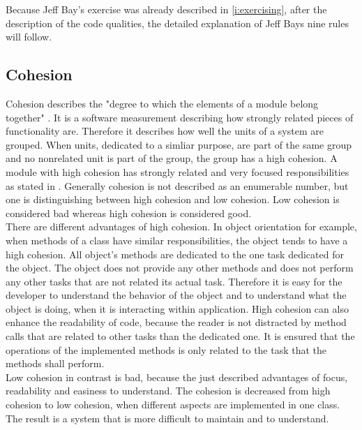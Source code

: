 Because Jeff Bay's exercise was already described in \ref{i:exercising}, after the description of the code qualities, the detailed explanation of Jeff Bays nine rules will follow. 

\subsection*{Cohesion}
\label{cohesion}
Cohesion describes the "degree to which the elements of a module belong together" \cite{cohesionBook}. It is a software measurement describing how strongly related pieces of functionality are. Therefore it describes how well the units of a system are grouped. When units, dedicated to a simliar purpose, are part of the same group and no nonrelated unit is part of the group, the group has a high cohesion. A module with high cohesion has strongly related and very focused responsibilities as stated in \cite[Cohesion]{wiki}. Generally cohesion is not described as an enumerable number, but one is distinguishing between high cohesion and low cohesion. Low cohesion is considered bad whereas high cohesion is considered good.\\

There are different advantages of high cohesion. In object orientation for example, when methods of a class have similar responsibilities, the object tends to have a high cohesion. All object's methods are dedicated to the one task dedicated for the object. The object does not provide any other methods and does not perform any other tasks that are not related its actual task. Therefore it is easy for the developer to understand the behavior of the object and to understand what the object is doing, when it is interacting within application. High cohesion can also enhance the readability of code, because the reader is not distracted by method calls that are related to other tasks than the dedicated one. It is ensured that the operations of the implemented methods is only related to the task that the methods shall perform. \\

Low cohesion in contrast is bad, because the just described advantages of focus, readability and easiness to understand. The cohesion is decreased from high cohesion to low cohesion, when different aspects are implemented in one class. The result is a system that is more difficult to maintain and to understand. 

